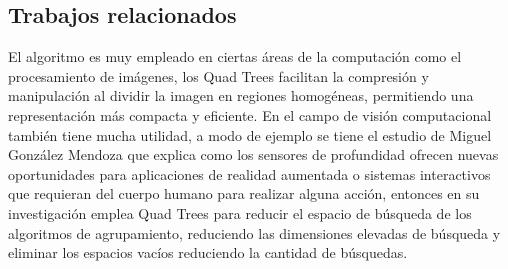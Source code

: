 \documentclass[9pt,a4paper,twoside]{rho-class/rho}
\begin{document}
        \subsection{Trabajos relacionados}
            El algoritmo es muy empleado en ciertas áreas de la computación como el procesamiento de imágenes, los Quad Trees facilitan la compresión y manipulación al dividir la imagen en regiones homogéneas, permitiendo una representación más compacta y eficiente. En el campo de visión computacional también tiene mucha utilidad, a modo de ejemplo se tiene el estudio de Miguel González Mendoza \cite{mendoza_advances} que explica como los sensores de profundidad ofrecen nuevas oportunidades para aplicaciones de realidad aumentada o sistemas interactivos que requieran del cuerpo humano para realizar alguna acción, entonces en su investigación emplea Quad Trees para reducir el espacio de búsqueda de los algoritmos de agrupamiento, reduciendo las dimensiones elevadas de búsqueda y eliminar los espacios vacíos reduciendo la cantidad de búsquedas.
\end{document}
